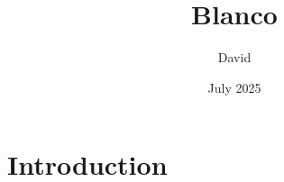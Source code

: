 \documentclass{article}
\title{Blanco}
\author{David}
\date{July 2025}
\begin{document}
\maketitle

\section{Introduction}
\end{document}
